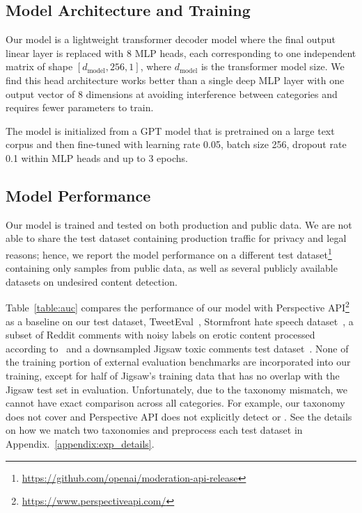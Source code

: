 \documentclass[letterpaper]{article} %
\begin{document}
\subsection{Model Architecture and Training}

Our model is a lightweight transformer decoder model where the final output linear layer is replaced with 8 MLP heads, each corresponding to one independent matrix of shape $[d_\text{model}, 256, 1]$, where $d_\text{model}$ is the transformer model size. We find this head architecture works better than a single deep MLP layer with one output vector of 8 dimensions at avoiding interference between categories and requires fewer parameters to train.

The model is initialized from a GPT model that is pretrained on a large text corpus and then fine-tuned with learning rate 0.05, batch size 256, dropout rate 0.1 within MLP heads and up to 3 epochs.


\subsection{Model Performance}

Our model is trained and tested on both production and public data. We are not able to share the test dataset containing production traffic for privacy and legal reasons; hence, we report the model performance on a different test dataset\footnote{
\url{https://github.com/openai/moderation-api-release}
} containing only samples from public data, as well as several publicly available datasets on undesired content detection.

Table~\ref{table:auc} compares the performance of our model with Perspective API\footnote{\url{https://www.perspectiveapi.com/}} as a baseline on our test dataset, TweetEval~\cite{barbieri2020tweeteval}, Stormfront hate speech dataset~\cite{gibert2018hate}, a subset of Reddit comments with noisy labels on erotic content processed according to~\citet{barrientos2020erotic} and a downsampled Jigsaw toxic comments test dataset~\cite{jigsaw_dataset}. None of the training portion of external evaluation benchmarks are incorporated into our training, except for half of Jigsaw's training data that has no overlap with the Jigsaw test set in evaluation.
%
Unfortunately, due to the taxonomy mismatch, we cannot have exact comparison across all categories. For example, our taxonomy does not cover  and Perspective API does not explicitly detect  or . See the details on how we match two taxonomies and preprocess each test dataset in Appendix.~\ref{appendix:exp_details}.
\end{document}
